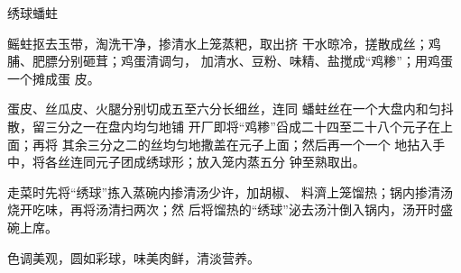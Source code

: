 \begin{recipe}{绣球蟠蛀}

\ingredients


\cooking

\step 鳐蛀抠去玉带，淘洗干净，掺清水上笼蒸粑，取出挤 干水晾冷，搓散成丝；鸡脯、肥膘分别砸茸；鸡蛋清调匀， 加清水、豆粉、味精、盐搅成“鸡糁”；用鸡蛋一个摊成蛋 皮。

蛋皮、丝瓜皮、火腿分别切成五至六分长细丝，连同 蟠蛀丝在一个大盘内和匀抖散，留三分之一在盘内均匀地铺 开厂即将“鸡糁”舀成二十四至二十八个元子在上面；再将 其余三分之二的丝均匀地撒盖在元子上面；然后再一个一个 地拈入手中，将各丝连同元子团成绣球形；放入笼内蒸五分 钟至熟取出。

\step 走菜时先将“绣球”拣入蒸碗内掺清汤少许，加胡椒、 料濟上笼馏热；锅内掺清汤烧开吃味，再将汤清扫两次；然 后将馏热的“绣球”泌去汤汁倒入锅内，汤开时盛碗上席。

\notes

色调美观，圆如彩球，味美肉鲜，清淡营养。

\end{recipe}


